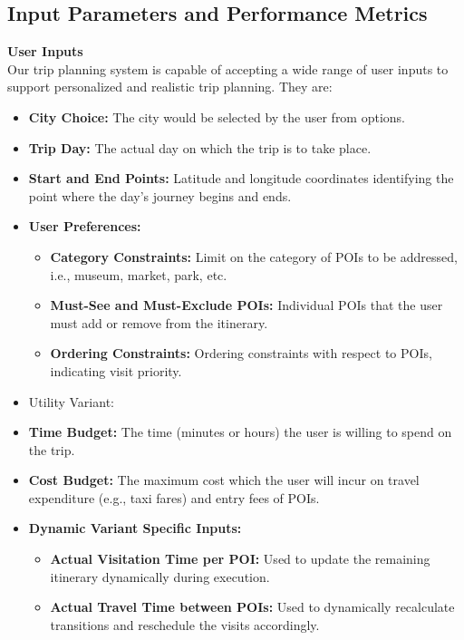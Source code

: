 \subsection{Input Parameters and Performance Metrics}

\textbf{User Inputs}\\
Our trip planning system is capable of accepting a wide range of user inputs to support personalized and realistic trip planning. They are:

\begin{itemize}
    \item \textbf{City Choice:} The city would be selected by the user from options.
    
    \item \textbf{Trip Day:} The actual day on which the trip is to take place.

    \item \textbf{Start and End Points:} Latitude and longitude coordinates identifying the point where the day's journey begins and ends.
    
    \item \textbf{User Preferences:}
    \begin{itemize}
        \item \textbf{Category Constraints:} Limit on the category of POIs to be addressed, i.e., museum, market, park, etc.
        \item \textbf{Must-See and Must-Exclude POIs:} Individual POIs that the user must add or remove from the itinerary.
        \item \textbf{Ordering Constraints:} Ordering constraints with respect to POIs, indicating visit priority.
    \end{itemize}
    
	\item Utility Variant: 
    \item \textbf{Time Budget:} The time (minutes or hours) the user is willing to spend on the trip.
    \item \textbf{Cost Budget:} The maximum cost which the user will incur on travel expenditure (e.g., taxi fares) and entry fees of POIs.
    
    \item \textbf{Dynamic Variant Specific Inputs:}
    \begin{itemize}
        \item \textbf{Actual Visitation Time per POI:} Used to update the remaining itinerary dynamically during execution.
        \item \textbf{Actual Travel Time between POIs:} Used to dynamically recalculate transitions and reschedule the visits accordingly.
    \end{itemize}
    

\end{itemize}
